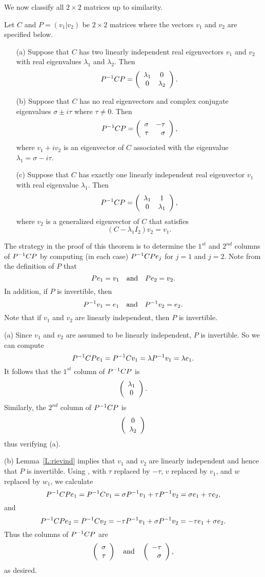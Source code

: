 We now classify all $2\times 2$ matrices up to similarity.

\begin{thm}  \label{T:putinform}
Let $C$ and $P=(v_1|v_2)$ be $2\times 2$ matrices where the vectors
$v_1$ and $v_2$ are specified below.
\begin{itemize}
\item[(a)]	Suppose that $C$ has two linearly independent
real eigenvectors $v_1$ and $v_2$ with real eigenvalues $\lambda_1$
and $\lambda_2$.  Then
\[
P^{-1} CP = \left(\begin{array}{cc} \lambda_1 & 0\\ 0 &\lambda_2\end{array}\right).
\]

\item[(b)]	Suppose that $C$ has no real eigenvectors and
complex conjugate eigenvalues $\sigma\pm i\tau$ where
$\tau\neq 0$.  Then
\[
P^{-1} CP = \left(\begin{array}{rr} \sigma & -\tau\\ \tau &\sigma\end{array}\right),
\]
where $v_1 + iv_2$ is an eigenvector of $C$ associated with the
eigenvalue $\lambda_1=\sigma-i\tau$.

\item[(c)]	Suppose that $C$ has exactly one linearly
independent real eigenvector $v_1$ with real eigenvalue $\lambda_1$.
Then
\[
P^{-1} CP = \left(\begin{array}{cc} \lambda_1 & 1\\ 0 &\lambda_1\end{array}\right),
\]
where  $v_2$ is a generalized eigenvector of $C$ that satisfies
\begin{equation}  \label{e:Cw=lw+v}
(C-\lambda_1 I_2) v_2 =  v_1.
\end{equation}

\end{itemize}
\end{thm}

\proof
The strategy in the proof of this theorem is to determine the
$1^{st}$ and $2^{nd}$ columns of $P^{-1} CP$ by computing (in each case)
$P^{-1} CPe_j$ for $j=1$ and $j=2$.  Note from the definition of $P$
that
\[
Pe_1 = v_1 \quad\mbox{and}\quad Pe_2 = v_2.
\]
In addition, if $P$ is invertible, then
\[
P^{-1} v_1 = e_1 \quad\mbox{and}\quad P^{-1} v_2 = e_2.
\]
Note that if $v_1$ and $v_2$ are linearly independent, then $P$ is invertible.

(a) \quad Since $v_1$ and $v_2$ are assumed to be linearly independent,
$P$ is invertible.  So we can compute
\[
P^{-1} CPe_1 = P^{-1} C v_1 = \lambda P^{-1} v_1 = \lambda e_1.
\]
It follows that the $1^{st}$ column of $P^{-1} CP$	is
\[
\left(\begin{array}{c} \lambda_1 \\ 0\end{array}\right).
\]
Similarly, the $2^{nd}$ column of $P^{-1} CP$ is
\[
\left(\begin{array}{c} 0 \\ \lambda_2\end{array}\right)
\]
thus verifying (a).

(b) \quad  Lemma~\ref{L:rievind} implies that $v_1$ and $v_2$ are linearly
independent and hence that $P$ is invertible.  Using ,
with $\tau$ replaced by $-\tau$, $v$ replaced by $v_1$, and $w$ replaced by
$w_1$, we calculate
\[
P^{-1} CPe_1 = P^{-1} Cv_1 = \sigma P^{-1} v_1 + \tau P^{-1} v_2
= \sigma e_1 + \tau e_2,
\]
and
\[
P^{-1} CPe_2 = P^{-1} Cv_2 = -\tau P^{-1} v_1 + \sigma P^{-1} v_2
= -\tau e_1 + \sigma e_2.
\]
Thus the columns of $P^{-1} CP$ are
\[
\left(\begin{array}{r} \sigma \\ \tau\end{array}\right) \quad\mbox{and}\quad \left(\begin{array}{r} -\tau \\ \sigma\end{array}\right),
\]
as desired.


